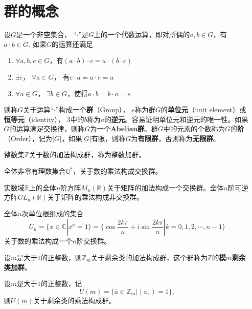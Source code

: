 \section{群的概念}
\begin{definition}\label{group}
	设$G$是一个非空集合， “$\cdot$”是$G$上的一个代数运算，即对所偶的$a, b\in G$，有$a\cdot b\in G$. 如果$G$的运算还满足
	\begin{enumerate}
		\item $\forall a, b, c\in G$，有$(a\cdot b)\cdot c = a\cdot (b\cdot c)$
		\item $\exists e$， $\forall a\in G$， 有$e\cdot a = a\cdot e = a$
		\item $\forall a\in G$， $\exists b\in G$，使得$a\cdot b = b\cdot a = e$
	\end{enumerate}
	则称$G$关于运算“$\cdot$”构成一个\textbf{群}（Group）， $e$称为群$G$的\textbf{单位元}（unit element）或\textbf{恒等元}（identity）， 3中的$b$称为$a$的\textbf{逆元}。容易证明单位元和逆元的唯一性。如果$G$的运算满足交换律，则称$G$为一个\textbf{Abelian群}。群$G$中的元素的个数称为$G$的\textbf{阶}（Order），记为$|G|$，如果$|G|$有限，则称$G$为\textbf{有限群}，否则称为\textbf{无限群}。
\end{definition}
\medskip
\begin{example}
	整数集$\mathbb{Z}$关于数的加法构成群，称为整数加群。
\end{example}
\begin{example}
	全体非零有理数集合$\mathbb{Q}^*$，关于数的乘法构成交换群。
\end{example}
\begin{example}
	实数域$\mathbb{R}$上的全体$n$阶方阵$M_n(\mathbb{R})$关于矩阵的加法构成一个交换群。全体$n$阶可逆方阵$GL_n(\mathbb{R})$关于矩阵的乘法构成非交换群。
\end{example}
\begin{example}
	全体$n$次单位根组成的集合
	\begin{equation}
		U_n = \{x\in\mathbb{C}|x^n = 1\} = \{\cos{\frac{2k\pi}{n}}+i\sin {\frac{2k\pi}{n}}|k = 0, 1, 2, \cdots, n-1\}
	\end{equation}
	关于数的乘法构成一个$n$阶交换群。
\end{example}
\begin{example}
	设$m$是大于$1$的正整数，则$\mathbb{Z}_m$关于剩余类的加法构成群，这个群称为$\mathbb{Z}$的\textbf{模$m$剩余类加群}。
\end{example}
\begin{example}
	设$m$是大于$1$的正整数，记
	\begin{equation}
		U(m) = \{\bar{a}\in \mathbb{Z}_m|(a, ) = 1\},
	\end{equation}
	则$U(m)$关于剩余类的乘法构成群。
\end{example}
